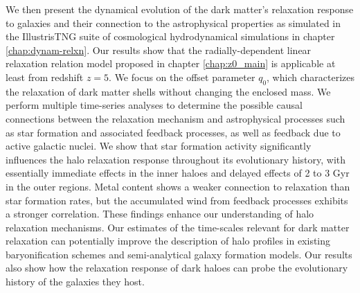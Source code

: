 \documentclass[a4paper, 12pt, oneside]{Thesis}  %
\begin{document}
{We then present the dynamical evolution of the dark matter's relaxation response to galaxies and their connection to the astrophysical properties as simulated in the IllustrisTNG suite of cosmological hydrodynamical simulations in chapter \ref{chap:dynam-relxn}. Our results show that the radially-dependent linear relaxation relation model proposed in chapter \ref{chap:z0_main} is applicable at least from redshift $z=5$. We focus on the offset parameter $q_0$, which characterizes the relaxation of dark matter shells without changing the enclosed mass. We perform multiple time-series analyses to determine the possible causal connections between the relaxation mechanism and astrophysical processes such as star formation and associated feedback processes, as well as feedback due to active galactic nuclei. We show that star formation activity significantly influences the halo relaxation response throughout its evolutionary history, with essentially immediate effects in the inner haloes and delayed effects of 2 to 3 Gyr in the outer regions. Metal content shows a weaker connection to relaxation than star formation rates, but the accumulated wind from feedback processes exhibits a stronger correlation. These findings enhance our understanding of halo relaxation mechanisms. Our estimates of the time-scales relevant for dark matter relaxation can potentially improve the description of halo profiles in existing baryonification schemes and semi-analytical galaxy formation models. Our results also show how the relaxation response of dark haloes can probe the evolutionary history of the galaxies they host.

}
\end{document}

